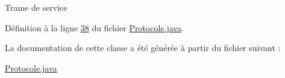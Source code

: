 Trame de service 

Définition à la ligne \hyperlink{_protocole_8java_source_l00038}{38} du fichier \hyperlink{_protocole_8java_source}{Protocole.\+java}.



La documentation de cette classe a été générée à partir du fichier suivant \+:\begin{DoxyCompactItemize}
\item 
\hyperlink{_protocole_8java}{Protocole.\+java}\end{DoxyCompactItemize}
